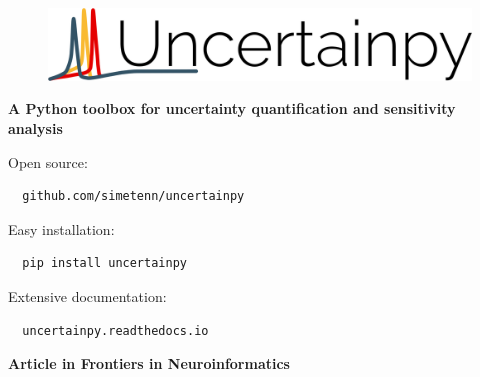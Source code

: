 \documentclass[presentation]{beamer}
\begin{document}


\begin{frame}[fragile]
  \vspace{-0.3cm}
  \begin{figure}
  \includegraphics[width=1\textwidth]{uncertainpy.png}
  \end{figure}



  {\LARGE \bf A Python toolbox for uncertainty quantification and sensitivity analysis}

  \vspace{0.4cm}


  Open source:

  \begin{lstlisting}
  github.com/simetenn/uncertainpy
  \end{lstlisting}


  Easy installation:

  \begin{lstlisting}
  pip install uncertainpy
  \end{lstlisting}

Extensive documentation:

\begin{lstlisting}
  uncertainpy.readthedocs.io
\end{lstlisting}


\vspace{0.4cm}


\textbf{Article in Frontiers in Neuroinformatics}








\end{frame}
\end{document}

